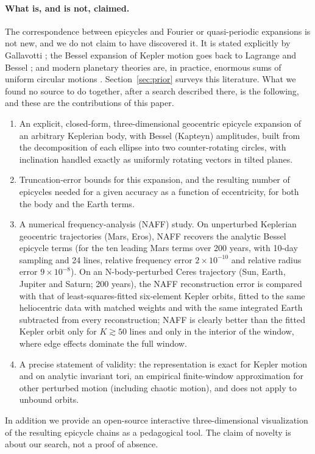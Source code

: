 \paragraph*{What is, and is not, claimed.}
The correspondence between epicycles and Fourier or quasi-periodic expansions
is not new, and we do not claim to have discovered it. It is stated
explicitly by Gallavotti \cite{Gallavotti2001}; the Bessel expansion of
Kepler motion goes back to Lagrange and Bessel
\cite{Dutka1995,Kapteyn1893}; and modern planetary theories are, in
practice, enormous sums of uniform circular motions
\cite{Bretagnon1988,Kudryavtsev2016}. Section~\ref{sec:prior} surveys this
literature. What we found no source to do together, after a search described
there, is the following, and these are the contributions of this paper.
\begin{enumerate}
\item An explicit, closed-form, three-dimensional geocentric epicycle
expansion of an arbitrary Keplerian body, with Bessel (Kapteyn) amplitudes,
built from the decomposition of each ellipse into two counter-rotating
circles, with inclination handled exactly as uniformly rotating vectors in
tilted planes.
\item Truncation-error bounds for this expansion, and the resulting number
of epicycles needed for a given accuracy as a function of eccentricity, for
both the body and the Earth terms.
\item A numerical frequency-analysis (NAFF) study. On unperturbed Keplerian
geocentric trajectories (Mars, Eros), NAFF recovers the analytic Bessel
epicycle terms (for the ten leading Mars terms over 200 years, with 10-day sampling and 24 lines, relative frequency error
$2\times10^{-10}$ and relative radius error $9\times10^{-8}$).
On an N-body-perturbed Ceres trajectory (Sun, Earth, Jupiter and
Saturn; 200 years), the NAFF reconstruction error is compared with that of
least-squares-fitted six-element Kepler orbits, fitted to the same heliocentric
data with matched weights and with the same integrated Earth subtracted from every
reconstruction; NAFF is clearly better than the fitted Kepler orbit only for
$K\gtrsim50$ lines and only in the interior of the window, where edge effects
dominate the full window.
\item A precise statement of validity: the representation is exact for Kepler motion and
on analytic invariant tori, an empirical finite-window approximation for other
perturbed motion (including chaotic motion), and does not apply to unbound
orbits.
\end{enumerate}
In addition we provide an open-source interactive three-dimensional
visualization of the resulting epicycle chains as a pedagogical tool. The
claim of novelty is about our search, not a proof of absence.

